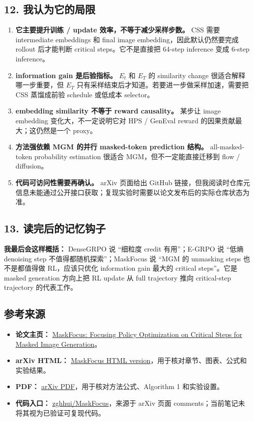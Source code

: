 \subsection{12. 我认为它的局限}

\begin{enumerate}[leftmargin=1.5em]
  \item \textbf{它主要提升训练 / update 效率，不等于减少采样步数。} CSS 需要 intermediate embeddings 和 final image embedding，因此默认仍然要完成 rollout 后才能判断 critical steps。它不是直接把 64-step inference 变成 6-step inference。
  \item \textbf{information gain 是后验指标。} \(E_t\) 和 \(E_T\) 的 similarity change 很适合解释哪一步重要，但 \(E_T\) 只有采样结束后才知道。若要进一步做采样加速，需要把 CSS 蒸馏成前验 schedule 或低成本 selector。
  \item \textbf{embedding similarity 不等于 reward causality。} 某步让 image embedding 变化大，不一定说明它对 HPS / GenEval reward 的因果贡献最大；这仍然是一个 proxy。
  \item \textbf{方法强依赖 MGM 的并行 masked-token prediction 结构。} all-masked-token probability estimation 很适合 MGM，但不一定能直接迁移到 flow / diffusion。
  \item \textbf{代码可访问性需要再确认。} arXiv 页面给出 GitHub 链接，但我阅读时仓库元信息未能通过公开接口获取；复现实验时需要以论文发布后的实际仓库状态为准。
\end{enumerate}

\subsection{13. 读完后的记忆钩子}

\begin{summarybox}
\textbf{我最后会这样概括：} DenseGRPO 说 ``细粒度 credit 有用''；E-GRPO 说 ``低熵 denoising step 不值得都随机探索''；MaskFocus 说 ``MGM 的 unmasking steps 也不是都值得做 RL，应该只优化 information gain 最大的 critical steps''。它是 masked generation 方向上把 RL update 从 full trajectory 推向 critical-step trajectory 的代表工作。
\end{summarybox}

\subsection{参考来源}

\begin{itemize}[leftmargin=1.5em]
  \item \textbf{论文主页：} \href{https://arxiv.org/abs/2512.18766}{MaskFocus: Focusing Policy Optimization on Critical Steps for Masked Image Generation}。
  \item \textbf{arXiv HTML：} \href{https://arxiv.org/html/2512.18766v1}{MaskFocus HTML version}，用于核对章节、图表、公式和实验结果。
  \item \textbf{PDF：} \href{https://arxiv.org/pdf/2512.18766}{arXiv PDF}，用于核对方法公式、Algorithm 1 和实验设置。
  \item \textbf{代码入口：} \href{https://github.com/zghhui/MaskFocus}{zghhui/MaskFocus}，来源于 arXiv 页面 comments；当前笔记未将其视为已验证可复现代码。
\end{itemize}
